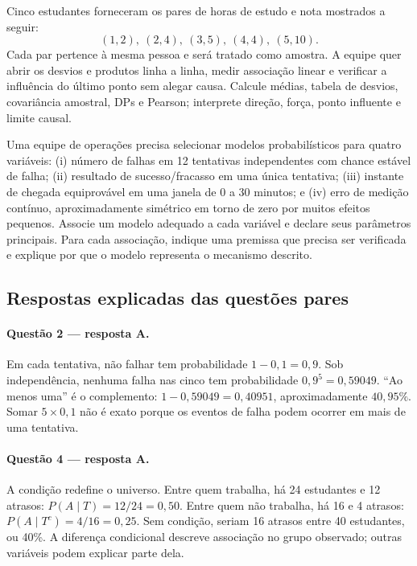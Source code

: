 \TextoBase Cinco estudantes forneceram os pares de horas de estudo e nota mostrados a seguir:
\[
(1,2),\ (2,4),\ (3,5),\ (4,4),\ (5,10).
\]
Cada par pertence à mesma pessoa e será tratado como amostra. A equipe quer abrir os desvios e produtos linha a linha, medir associação linear e verificar a influência do último ponto sem alegar causa.
\FonteDidatica
\Comando Calcule médias, tabela de desvios, covariância amostral, DPs e Pearson; interprete direção, força, ponto influente e limite causal.

\TextoBase Uma equipe de operações precisa selecionar modelos probabilísticos para quatro variáveis: (i) número de falhas em 12 tentativas independentes com chance estável de falha; (ii) resultado de sucesso/fracasso em uma única tentativa; (iii) instante de chegada equiprovável em uma janela de 0 a 30 minutos; e (iv) erro de medição contínuo, aproximadamente simétrico em torno de zero por muitos efeitos pequenos.
\FonteDidatica
\Comando Associe um modelo adequado a cada variável e declare seus parâmetros principais. Para cada associação, indique uma premissa que precisa ser verificada e explique por que o modelo representa o mecanismo descrito.
\newpage\subsection{Respostas explicadas das questões pares}
\paragraph{Questão 2 — resposta A.} Em cada tentativa, não falhar tem probabilidade $1-0{,}1=0{,}9$. Sob independência, nenhuma falha nas cinco tem probabilidade $0{,}9^5=0{,}59049$. ``Ao menos uma'' é o complemento: $1-0{,}59049=0{,}40951$, aproximadamente $40{,}95\%$. Somar $5\times0{,}1$ não é exato porque os eventos de falha podem ocorrer em mais de uma tentativa.

\paragraph{Questão 4 — resposta A.} A condição redefine o universo. Entre quem trabalha, há 24 estudantes e 12 atrasos: $P(A\mid T)=12/24=0{,}50$. Entre quem não trabalha, há 16 e 4 atrasos: $P(A\mid T^c)=4/16=0{,}25$. Sem condição, seriam 16 atrasos entre 40 estudantes, ou 40\%. A diferença condicional descreve associação no grupo observado; outras variáveis podem explicar parte dela.

